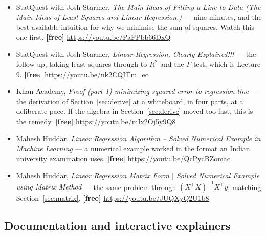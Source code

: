 \documentclass[11pt]{article}
\begin{document}
\begin{itemize}[leftmargin=*]
  \item StatQuest with Josh Starmer, \emph{The Main Ideas of Fitting a Line to
    Data (The Main Ideas of Least Squares and Linear Regression.)} --- nine
    minutes, and the best available intuition for why we minimise the sum of
    squares. Watch this one first. \textbf{[free]}
    \url{https://youtu.be/PaFPbb66DxQ}
  \item StatQuest with Josh Starmer, \emph{Linear Regression, Clearly
    Explained!!!} --- the follow-up, taking least squares through to $R^2$ and
    the $F$ test, which is Lecture 9. \textbf{[free]}
    \url{https://youtu.be/nk2CQITm_eo}
  \item Khan Academy, \emph{Proof (part 1) minimizing squared error to
    regression line} --- the derivation of Section~\ref{sec:derive} at a
    whiteboard, in four parts, at a deliberate pace. If the algebra in
    Section~\ref{sec:derive} moved too fast, this is the remedy.
    \textbf{[free]} \url{https://youtu.be/mIx2Oj5y9Q8}
  \item Mahesh Huddar, \emph{Linear Regression Algorithm -- Solved Numerical
    Example in Machine Learning} --- a numerical example worked in the format
    an Indian university examination uses. \textbf{[free]}
    \url{https://youtu.be/QcPycBZomac}
  \item Mahesh Huddar, \emph{Linear Regression Matrix Form $\vert$ Solved
    Numerical Example using Matrix Method} --- the same problem through
    $(X^{\!\top}\!X)^{-1}X^{\!\top}y$, matching Section~\ref{sec:matrix}.
    \textbf{[free]} \url{https://youtu.be/JUQXyQ2U1b8}
\end{itemize}

\subsection*{Documentation and interactive explainers}
\end{document}
